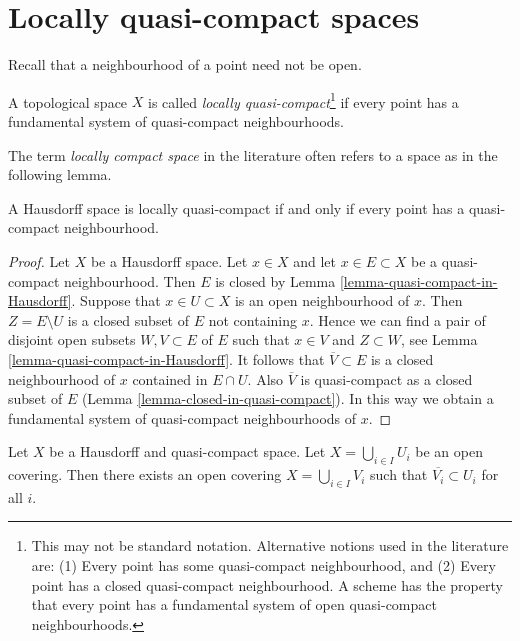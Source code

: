 \section{Locally quasi-compact spaces}
\label{section-locally-quasi-compact}

\noindent
Recall that a neighbourhood of a point need not be open.

\begin{definition}
\label{definition-locally-quasi-compact}
A topological space $X$ is called
{\it locally quasi-compact}\footnote{This may not be standard notation.
Alternative notions used in the literature are: (1) Every point has some
quasi-compact neighbourhood, and (2) Every point has a closed quasi-compact
neighbourhood. A scheme has the property that every point has a fundamental
system of open quasi-compact neighbourhoods.} if every
point has a fundamental system of quasi-compact neighbourhoods.
\end{definition}

\noindent
The term {\it locally compact space} in the literature often refers
to a space as in the following lemma.

\begin{lemma}
\label{lemma-locally-quasi-compact-Hausdorff}
A Hausdorff space is locally quasi-compact if and only if every point
has a quasi-compact neighbourhood.
\end{lemma}

\begin{proof}
Let $X$ be a Hausdorff space. Let $x \in X$ and let $x \in E \subset X$
be a quasi-compact neighbourhood. Then $E$ is closed by
Lemma \ref{lemma-quasi-compact-in-Hausdorff}.
Suppose that $x \in U \subset X$ is an open neighbourhood of $x$.
Then $Z = E \setminus U$ is a closed subset of $E$ not containing $x$.
Hence we can find a pair of disjoint open subsets $W, V \subset E$
of $E$ such that $x \in V$ and $Z \subset W$, see
Lemma \ref{lemma-quasi-compact-in-Hausdorff}.
It follows that $\overline{V} \subset E$ is a closed neighbourhood
of $x$ contained in $E \cap U$. Also $\overline{V}$ is quasi-compact
as a closed subset of $E$ (Lemma \ref{lemma-closed-in-quasi-compact}).
In this way we obtain a fundamental system of quasi-compact neighbourhoods
of $x$.
\end{proof}

\begin{lemma}
\label{lemma-relatively-compact-refinement}
Let $X$ be a Hausdorff and quasi-compact space.
Let $X = \bigcup_{i \in I} U_i$ be an open covering.
Then there exists an open covering $X = \bigcup_{i \in I} V_i$
such that $\overline{V_i} \subset U_i$ for all $i$.
\end{lemma}

